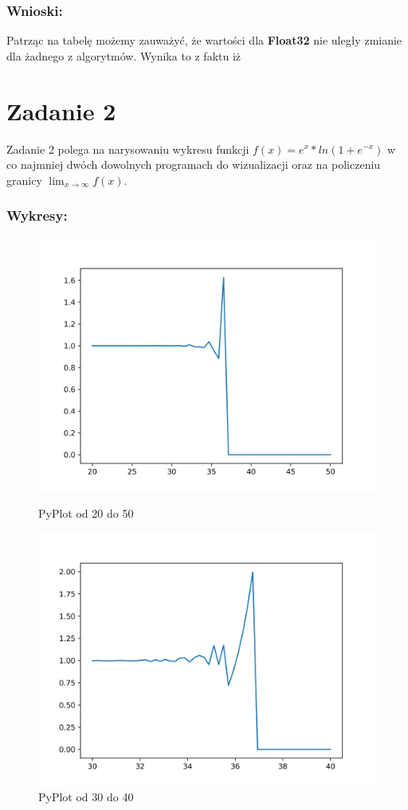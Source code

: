 \documentclass[12pt]{article}
\begin{document}
\subsubsection*{Wnioski:}
Patrząc na tabelę możemy zauważyć, że wartości dla \textbf{Float32} nie uległy zmianie dla żadnego z algorytmów. Wynika to z faktu iż 


\section{Zadanie 2}
Zadanie 2 polega na narysowaniu wykresu funkcji $f(x) = e^x*ln(1+e^{-x})$ w co najmniej dwóch dowolnych programach do wizualizacji oraz na policzeniu granicy $ \lim_{x \to \infty} f(x)$.

\newpage
\subsubsection*{Wykresy:}

\begin{figure}[!htb]
  \includegraphics[width=\linewidth]{zad2_plot_py2.png}
  \caption{PyPlot od 20 do 50}\label{fig:figure1}
\endminipage\hfill
{}
  \includegraphics[width=\linewidth]{zad2_plot_py.png}
  \caption{PyPlot od 30 do 40}\label{fig:figure2}
\endminipage
\end{figure}
\end{document}
